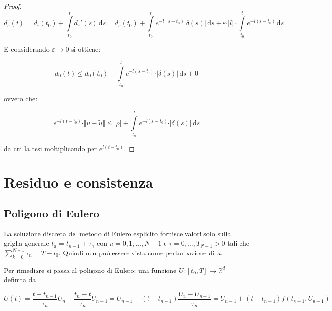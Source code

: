 \documentclass[hidelinks, 10pt]{report}
\begin{document}
\begin{proof}
\[
d_{\varepsilon} (t) = d_{\varepsilon}(t_{0}) + \int\limits_{t_{0}}^{t} d_{\varepsilon}'(s)\, \mathrm{d}s = d_\varepsilon(t_{0}) + \int\limits_{t_{0}}^{t} e^{-l(s - t_{0})} \vert \delta(s) \vert\, \mathrm{d}s + \varepsilon \cdot \vert l \vert \cdot \int\limits_{t_{0}}^{t} e^{-l(s - t_{0})}\,\mathrm{d}s
\]
 
E considerando $ \varepsilon \to 0 $ si ottiene:

\[ d_{0}(t) \leq d_{0}(t_{0})+ \int\limits_{t_{0}}^{t} e^{-l(s - t_{0})} \cdot \vert \delta(s) \vert\, \mathrm{d}s + 0 \] 

ovvero che:

\[ e^{-l(t - t_{0})} \cdot \Vert u - \tilde{u} \Vert \leq \vert \rho \vert + \int\limits_{t_{0}}^{t} e^{-l(s - t_{0})} \cdot \vert \delta(s) \vert\, \mathrm{d}s \]

da cui la tesi moltiplicando per $ e^{l(t - t_{0})} $.
\end{proof}

\section{Residuo e consistenza}
\subsection{Poligono di Eulero}

La soluzione discreta del metodo di Eulero esplicito fornisce valori solo sulla griglia generale $ t_{n} = t_{n-1} + \tau_{n} $ con $ n = 0, 1, \dotsc, N - 1 $ e $ \tau = 0, \dotsc, T_{N - 1} > 0 $ tali che $ \sum\limits_{k = 0}^{N - 1} \tau_{n} = T - t_{0} $. Quindi non pu\`o essere vista come perturbazione di $ u $.

Per rimediare si passa al poligono di Eulero: una funzione $ U: [t_{0}, T] \to \mathbb{R}^{d} $ definita da

\begin{dmath*}
U(t) = \frac{t - t_{n - 1}}{\tau_{n}} U_n + \frac{t_{n} - t}{\tau_{n}} U_{n - 1} = U_{n - 1} + (t - t_{n - 1}) \frac{U_{n} - U_{n-1}}{\tau_{n}} = U_{n - 1} + (t - t_{n - 1}) f(t_{n - 1}, U_{n - 1})
\end{dmath*}
\end{document}
